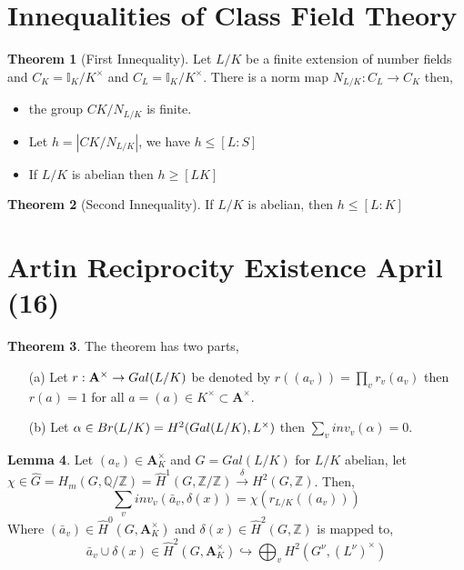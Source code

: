 \documentclass[12pt]{extarticle}
\newcommand{\Z}{\mathbb{Z}}
\newcommand{\Q}{\mathbb{Q}}
\newcommand{\galgroup}[1]{Gal \small(#1 \small)}
\newcommand{\idele}[1]{\mathbb{I}_{#1}}
\theoremstyle{definition}
\newtheorem{theorem}{Theorem}[section]
\newtheorem{lemma}[theorem]{Lemma}
\begin{document}
\section{Innequalities of Class Field Theory }
\begin{theorem}[First Innequality]
Let $L / K$ be a finite extension of number fields and $C_K = \idele{K} / K^\times$ and $C_L = \idele{K} / K^\times$. There is a norm map $N_{L/K} : C_L \to C_K$ then,
\begin{itemize}
\item the group $CK/N_{L/K}$ is finite.
\item Let $h = |CK/N_{L/K}|$, we have $h \le [L : S]$ 
\item If $L/K$ is abelian then $h \ge [L K]$
\end{itemize}
\end{theorem}

\begin{theorem}[Second Innequality]
If $L/K$ is abelian, then $h \le [L : K]$
\end{theorem}

\section{Artin Reciprocity Existence April (16)}

\begin{theorem}
The theorem has two parts,
\begin{enumerate}
\item[(a)]
Let $r : \mathbf{A}^\times \to \galgroup{L/K}$ be denoted by $r((a_v)) = \prod_v r_v(a_v)$ then $r(a) = 1$ for all $a = (a) \in K^\times \subset \mathbf{A}^\times$.

\item[(b)]
Let $\alpha \in Br(L/K) = H^2(\galgroup{L/K}, L^\times)$ then $\sum_{v} inv_v(\alpha) = 0$.
\end{enumerate}
\end{theorem}

\begin{lemma}
Let $(a_v) \in \mathbf{A}^\times_K$ and $G = Gal(L/K)$ for $L/K$ abelian, let $\chi \in \hat{G} = H_m(G, \Q / \Z) = \hat{H}^1(G, \Z /\Z) \xrightarrow{\delta} H^2(G, \Z)$. Then,
\[ \sum_{v} inv_v(\bar{a}_v, \delta(x)) = \chi(r_{L/K}((a_v)))\]
Where $(\bar{a}_v) \in \hat{H}^0(G, \mathbf{A}_K^\times)$ and
$\delta(x) \in \hat{H}^2 (G, \Z)$ is mapped to,
\[\bar{a}_v \cup \delta(x) \in \hat{H}^2(G, \mathbf{A}_K^\times) \hookrightarrow \bigoplus_v H^2(G^\nu, (L^\nu)^\times)\]
\end{lemma}
\end{document}
